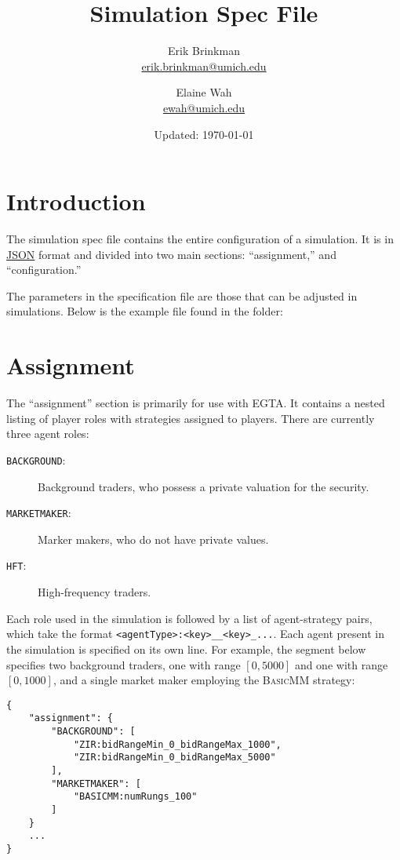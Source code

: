 \documentclass[11pt]{article}
\begin{document}
	
\title{Simulation Spec File}
\author{
  Erik Brinkman \\
  \href{mailto:erik.brinkman@umich.edu}{erik.brinkman@umich.edu}
  \and
  Elaine Wah \\
  \href{mailto:ewah@umich.edu}{ewah@umich.edu}
}
\date{Updated: \today}
\maketitle

\section{Introduction}

The simulation spec file contains the entire configuration of a simulation. It
is in \href{https://en.wikipedia.org/wiki/Json}{JSON} format and divided into
two main sections: ``assignment,'' and ``configuration.''

The parameters in the specification file are those that can be adjusted in
simulations. Below is the example  file found in
the  folder:



\section{Assignment}

The ``assignment'' section is primarily for use with EGTA. It contains a
nested listing of player roles with strategies assigned to players. 
%
There are currently three agent roles:
 \begin{description}
  \item[\texttt{BACKGROUND}:] Background traders, who possess a private valuation for the security.
  \item[\texttt{MARKETMAKER}:] Marker makers, who do not have private values.
  \item[\texttt{HFT}:] High-frequency traders.
  \end{description}

Each role used in the simulation is followed by a list of agent-strategy pairs, which take the format \texttt{<agentType>:<key>\_<value1>\_<key>\_<value2>...}. Each agent present in the simulation is specified on its own line.
%
For example, the segment below specifies two background traders, one with range $[0, 5000]$ and one with range $[0, 1000]$, and a single market maker employing the \textsc{BasicMM} strategy:
%
\begin{verbatim}
{
    "assignment": {
        "BACKGROUND": [
            "ZIR:bidRangeMin_0_bidRangeMax_1000",
            "ZIR:bidRangeMin_0_bidRangeMax_5000"
        ],
        "MARKETMAKER": [
            "BASICMM:numRungs_100"
        ]
    }
    ...
}
\end{verbatim}
\end{document}
